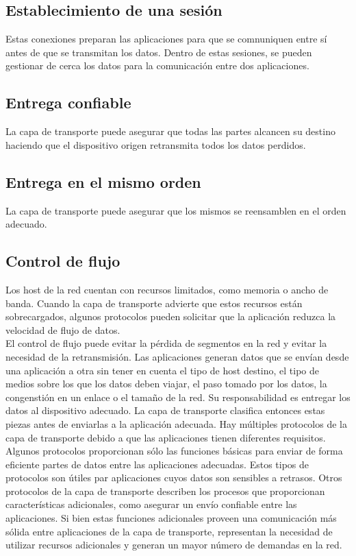 \documentclass[12pt]{report}
\begin{document}
        \subsection{Establecimiento de una sesión}
        Estas conexiones preparan las aplicaciones para que se comnuniquen entre sí antes de que se transmitan los datos.
        Dentro de estas sesiones, se pueden gestionar de cerca los datos para la comunicación entre dos aplicaciones. 
        \subsection{Entrega confiable}
        La capa de transporte puede asegurar que todas las partes alcancen su destino haciendo que el dispositivo origen retransmita todos los datos perdidos. 
        \subsection{Entrega en el mismo orden}
        La capa de transporte puede asegurar que los mismos se reensamblen en el orden adecuado.
        \subsection{Control de flujo}
        Los host de la red cuentan con recursos limitados,  como memoria o ancho de banda.
        Cuando la capa de transporte advierte que estos recursos están sobrecargados, algunos protocolos pueden solicitar que la aplicación reduzca la velocidad de flujo de datos.
        \\El control de flujo puede evitar la pérdida de segmentos en la red y evitar la necesidad de la retransmisión.
        Las aplicaciones generan datos que se envían desde una aplicación a otra sin tener en cuenta el tipo de host destino, el tipo de medios sobre los que los datos deben viajar, el paso tomado por los datos,  la congenstión en un enlace o el tamaño de la red.
        Su responsabilidad  es entregar los datos al dispositivo adecuado. La capa de transporte clasifica entonces estas piezas antes de enviarlas a la aplicación adecuada.
        Hay múltiples protocolos de la capa de transporte debido a que las aplicaciones tienen diferentes requisitos.
        \\Algunos protocolos proporcionan sólo las funciones básicas para enviar de forma eficiente partes de datos entre las aplicaciones adecuadas.
        Estos tipos de protocolos son útiles par aplicaciones cuyos datos son sensibles a retrasos.
        Otros protocolos de la capa de transporte describen los procesos que proporcionan características adicionales, como asegurar un envío confiable entre las aplicaciones.
        Si bien estas funciones adicionales proveen una comunicación más sólida entre aplicaciones de la capa de transporte, representan la necesidad de utilizar recursos adicionales y generan un mayor número de demandas en la red.
\end{document}
